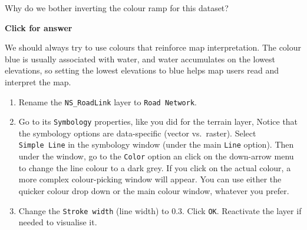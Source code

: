 \documentclass[
  letterpaper,
  DIV=11,
  numbers=noendperiod]{scrreprt}
\begin{document}
\begin{tcolorbox}[enhanced jigsaw, coltitle=black, toprule=.15mm, breakable, opacitybacktitle=0.6, left=2mm, colback=white, leftrule=.75mm, rightrule=.15mm, colbacktitle=quarto-callout-important-color!10!white, toptitle=1mm, titlerule=0mm, colframe=quarto-callout-important-color-frame, arc=.35mm, bottomtitle=1mm, opacityback=0, bottomrule=.15mm, title=\textcolor{quarto-callout-important-color}{\faExclamation}\hspace{0.5em}{Stop and Think}]

Why do we bother inverting the colour ramp for this dataset?

\end{tcolorbox}

\begin{tcolorbox}[enhanced jigsaw, toprule=.15mm, breakable, left=2mm, colframe=quarto-callout-important-color-frame, colback=white, arc=.35mm, leftrule=.75mm, opacityback=0, rightrule=.15mm, bottomrule=.15mm]

\vspace{-3mm}\textbf{Click for answer}\vspace{3mm}

We should always try to use colours that reinforce map interpretation.
The colour blue is usually associated with water, and water accumulates
on the lowest elevations, so setting the lowest elevations to blue helps
map users read and interpret the map.

\end{tcolorbox}

\begin{enumerate}
\def\labelenumi{(\arabic{enumi})}
\setcounter{enumi}{24}
\item
  Rename the \texttt{NS\_RoadLink} layer to \texttt{Road\ Network}.
\item
  Go to its \texttt{Symbology} properties, like you did for the terrain
  layer, Notice that the symbology options are data-specific (vector
  vs.~raster). Select \texttt{Simple\ Line} in the symbology window
  (under the main \texttt{Line} option). Then under the window, go to
  the \texttt{Color} option an click on the down-arrow menu to change
  the line colour to a dark grey. If you click on the actual colour, a
  more complex colour-picking window will appear. You can use either the
  quicker colour drop down or the main colour window, whatever you
  prefer.
\item
  Change the \texttt{Stroke\ width} (line width) to 0.3. Click
  \texttt{OK}. Reactivate the layer if needed to visualise it.
\end{enumerate}
\end{document}

